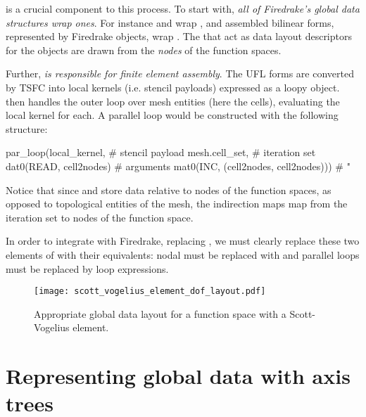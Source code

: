 \documentclass[thesis]{subfiles}
\begin{document}
 is a crucial component to this process.
To start with, \emph{all of Firedrake's global data structures wrap  ones}.
For instance  and  wrap  , and assembled bilinear forms, represented by Firedrake  objects, wrap  .
The  that act as data layout descriptors for the  objects are drawn from the \emph{nodes} of the function spaces.

Further, \emph{ is responsible for finite element assembly}.
The UFL forms are converted by TSFC into local kernels (i.e. stencil payloads) expressed as a loopy  object.
 then handles the outer loop over mesh entities (here the cells), evaluating the local kernel for each.
A parallel loop would be constructed with the following structure:
\begin{pyinline}
  par_loop(local_kernel,                         # stencil payload
           mesh.cell_set,                        # iteration set
           dat0(READ, cell2nodes)                # arguments
           mat0(INC, (cell2nodes, cell2nodes)))  #   "
\end{pyinline}
Notice that since  and  store data relative to nodes of the function spaces, as opposed to topological entities of the mesh, the indirection maps map from the iteration set to nodes of the function space.

In order to integrate  with Firedrake, replacing , we must clearly replace these two elements of  with their  equivalents: nodal  must be replaced with  and  parallel loops must be replaced by  loop expressions.

\begin{figure}
  \centering
  \texttt{[image: scott\_vogelius\_element\_dof\_layout.pdf]}
  \caption{
    Appropriate global data layout for a function space with a Scott-Vogelius element.
  }
  \label{fig:firedrake_data_tree}
\end{figure}

\section{Representing global data with axis trees}

\end{document}
